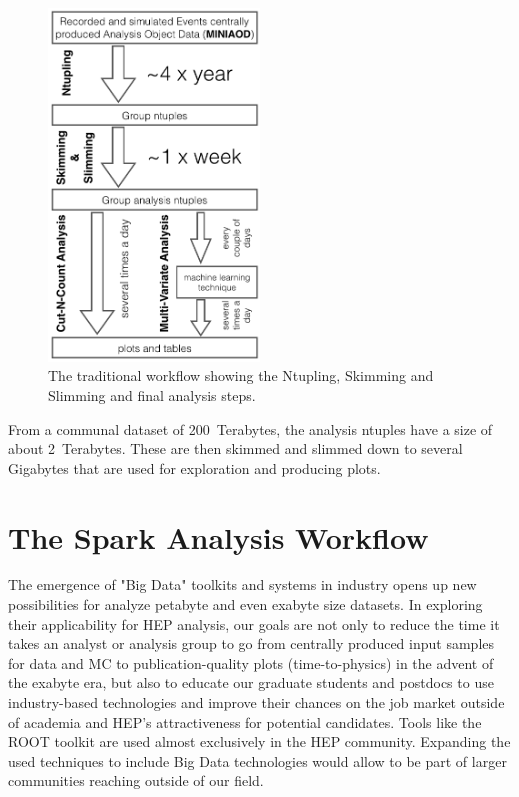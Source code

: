 \documentclass[a4paper]{jpconf}
\begin{document}
\begin{figure}
\begin{center}
\includegraphics[width=0.5\textwidth]{workflow.png}
\caption{\label{fig:workflow}The traditional workflow showing the Ntupling, Skimming and Slimming and final analysis steps.}
\end{center}
\end{figure}

From a communal dataset of 200~Terabytes, the analysis ntuples have a size of about 2~Terabytes. These are then skimmed and slimmed down to several Gigabytes that are used for exploration and producing plots.

\section{The Spark Analysis Workflow}
\label{sec:spark_workflow}

The emergence of "Big Data" toolkits and systems in industry opens up new possibilities for analyze petabyte and even exabyte size datasets. In exploring their applicability for HEP analysis, our goals are not only to reduce the time it takes an analyst or analysis group to go from centrally produced input samples for data and MC to publication-quality plots (time-to-physics) in the advent of the exabyte era, but also to educate our graduate students and postdocs to use industry-based technologies and improve their chances on the job market outside of academia and HEP's attractiveness for potential candidates. Tools like the ROOT toolkit are used almost exclusively in the HEP community. Expanding the used techniques to include Big Data technologies would allow to be part of larger communities reaching outside of our field. 
\end{document}
